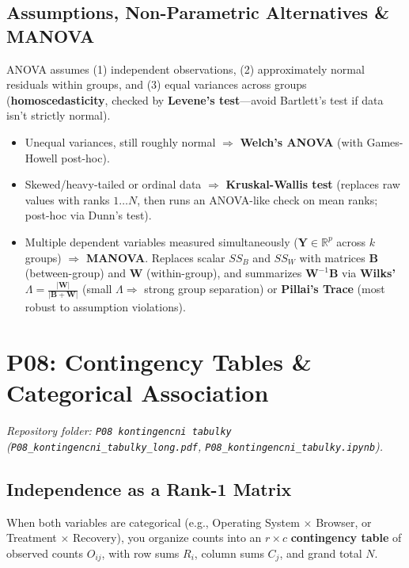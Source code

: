 \documentclass[11pt, a4paper]{article}
\begin{document}
\subsection{Assumptions, Non-Parametric Alternatives \& MANOVA}
ANOVA assumes (1) independent observations, (2) approximately normal residuals within groups, and (3) equal variances across groups (\textbf{homoscedasticity}, checked by \textbf{Levene's test}---avoid Bartlett's test if data isn't strictly normal).
\begin{itemize}
    \item Unequal variances, still roughly normal $\Longrightarrow$ \textbf{Welch's ANOVA} (with Games-Howell post-hoc).
    \item Skewed/heavy-tailed or ordinal data $\Longrightarrow$ \textbf{Kruskal-Wallis test} (replaces raw values with ranks $1 \dots N$, then runs an ANOVA-like check on mean ranks; post-hoc via Dunn's test).
    \item Multiple dependent variables measured simultaneously ($\mathbf{Y} \in \mathbb{R}^p$ across $k$ groups) $\Longrightarrow$ \textbf{MANOVA}. Replaces scalar $SS_B$ and $SS_W$ with matrices $\mathbf{B}$ (between-group) and $\mathbf{W}$ (within-group), and summarizes $\mathbf{W}^{-1}\mathbf{B}$ via \textbf{Wilks' $\Lambda = \frac{|\mathbf{W}|}{|\mathbf{B}+\mathbf{W}|}$} (small $\Lambda \Rightarrow$ strong group separation) or \textbf{Pillai's Trace} (most robust to assumption violations).
\end{itemize}

\section{P08: Contingency Tables \& Categorical Association}
\emph{Repository folder: \texttt{P08 kontingencni tabulky} (\texttt{P08\_kontingencni\_tabulky\_long.pdf}, \texttt{P08\_kontingencni\_tabulky.ipynb}).}

\subsection{Independence as a Rank-1 Matrix}
When both variables are categorical (e.g., Operating System $\times$ Browser, or Treatment $\times$ Recovery), you organize counts into an $r \times c$ \textbf{contingency table} of observed counts $O_{ij}$, with row sums $R_i$, column sums $C_j$, and grand total $N$.
\end{document}

